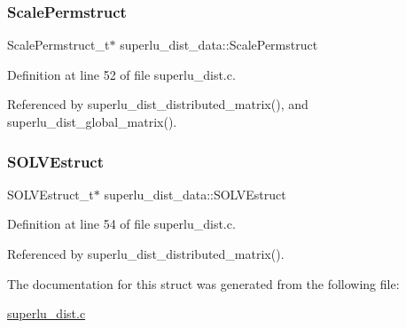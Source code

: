 \subsubsection{\texorpdfstring{Scale\+Permstruct}{ScalePermstruct}}
{\footnotesize\ttfamily Scale\+Permstruct\+\_\+t$\ast$ superlu\+\_\+dist\+\_\+data\+::\+Scale\+Permstruct}



Definition at line 52 of file superlu\+\_\+dist.\+c.



Referenced by superlu\+\_\+dist\+\_\+distributed\+\_\+matrix(), and superlu\+\_\+dist\+\_\+global\+\_\+matrix().

\mbox{\label{structsuperlu__dist__data_a81a9e27c956d010d355e3378824f378b}} 
\subsubsection{\texorpdfstring{S\+O\+L\+V\+Estruct}{SOLVEstruct}}
{\footnotesize\ttfamily S\+O\+L\+V\+Estruct\+\_\+t$\ast$ superlu\+\_\+dist\+\_\+data\+::\+S\+O\+L\+V\+Estruct}



Definition at line 54 of file superlu\+\_\+dist.\+c.



Referenced by superlu\+\_\+dist\+\_\+distributed\+\_\+matrix().



The documentation for this struct was generated from the following file\+:\begin{DoxyCompactItemize}
\item 
\hyperlink{superlu__dist_8c}{superlu\+\_\+dist.\+c}\end{DoxyCompactItemize}
